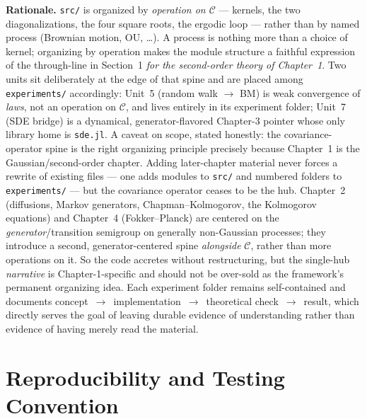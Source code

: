\documentclass[11pt]{article}
\begin{document}
\textbf{Rationale.} \texttt{src/} is organized by \emph{operation on $\mathcal{C}$} --- kernels, the two diagonalizations, the four square roots, the ergodic loop --- rather than by named process (Brownian motion, OU, \ldots). A process is nothing more than a choice of kernel; organizing by operation makes the module structure a faithful expression of the through-line in Section~1 \emph{for the second-order theory of Chapter~1}. Two units sit deliberately at the edge of that spine and are placed among \texttt{experiments/} accordingly: Unit~5 (random walk $\to$ BM) is weak convergence of \emph{laws}, not an operation on $\mathcal{C}$, and lives entirely in its experiment folder; Unit~7 (SDE bridge) is a dynamical, generator-flavored Chapter-3 pointer whose only library home is \texttt{sde.jl}. A caveat on scope, stated honestly: the covariance-operator spine is the right organizing principle precisely because Chapter~1 is the Gaussian/second-order chapter. Adding later-chapter material never forces a rewrite of existing files --- one adds modules to \texttt{src/} and numbered folders to \texttt{experiments/} --- but the covariance operator ceases to be the hub. Chapter~2 (diffusions, Markov generators, Chapman--Kolmogorov, the Kolmogorov equations) and Chapter~4 (Fokker--Planck) are centered on the \emph{generator}/transition semigroup on generally non-Gaussian processes; they introduce a second, generator-centered spine \emph{alongside} $\mathcal{C}$, rather than more operations on it. So the code accretes without restructuring, but the single-hub \emph{narrative} is Chapter-1-specific and should not be over-sold as the framework's permanent organizing idea. Each experiment folder remains self-contained and documents concept~$\to$~implementation~$\to$~theoretical check~$\to$~result, which directly serves the goal of leaving durable evidence of understanding rather than evidence of having merely read the material.

\section{Reproducibility and Testing Convention}
\end{document}
